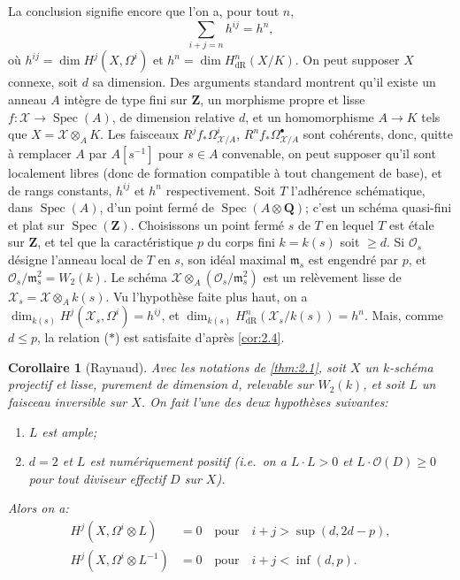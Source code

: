 \documentclass[12pt,a4paper]{article}
\theoremstyle{plain}
\newtheorem{corollary}[theorem]{Corollaire}
\theoremstyle{definition}
\theoremstyle{remark}
\DeclareMathOperator{\Spec}{Spec}
\newcommand{\cO}{\mathcal{O}}
\newcommand{\dR}{\text{dR}}
\begin{document}
La conclusion signifie encore que l'on a, pour tout $n$,
\begin{equation}\label{eq:star2}
\sum_{i+j=n} h^{ij} = h^n,
\tag{$*$}
\end{equation}
o\`u $h^{ij} = \dim H^j(X, \Omega^i)$ et $h^n = \dim H^n_{\dR}(X/K)$. On peut supposer $X$ connexe, soit $d$ sa dimension. Des arguments standard montrent qu'il existe un anneau $A$ int\`egre de type fini sur $\mathbf{Z}$, un morphisme propre et lisse $f: \mathscr{X} \to \Spec(A)$, de dimension relative $d$, et un homomorphisme $A \to K$ tels que $X = \mathscr{X} \otimes_A K$. Les faisceaux $R^j f_* \Omega^i_{\mathscr{X}/A}$, $R^n f_* \Omega^{\bullet}_{\mathscr{X}/A}$ sont coh\'erents, donc, quitte \`a remplacer $A$ par $A[s^{-1}]$ pour $s \in A$ convenable, on peut supposer qu'il sont localement libres (donc de formation compatible \`a tout changement de base), et de rangs constants, $h^{ij}$ et $h^n$ respectivement. Soit $T$ l'adh\'erence sch\'ematique, dans $\Spec(A)$, d'un point ferm\'e de $\Spec(A \otimes \mathbf{Q})$; c'est un sch\'ema quasi-fini et plat sur $\Spec(\mathbf{Z})$. Choisissons un point ferm\'e $s$ de $T$ en lequel $T$ est \'etale sur $\mathbf{Z}$, et tel que la caract\'eristique $p$ du corps fini $k = k(s)$ soit $\ge d$. Si $\cO_s$ d\'esigne l'anneau local de $T$ en $s$, son id\'eal maximal $\mathfrak{m}_s$ est engendr\'e par $p$, et $\cO_s/\mathfrak{m}_s^2 = W_2(k)$. Le sch\'ema $\mathscr{X} \otimes_A (\cO_s/\mathfrak{m}_s^2)$ est un rel\`evement lisse de $\mathscr{X}_s = \mathscr{X} \otimes_A k(s)$. Vu l'hypoth\`ese faite plus haut, on a $\dim_{k(s)} H^j(\mathscr{X}_s, \Omega^i) = h^{ij}$, et $\dim_{k(s)} H^n_{\dR}(\mathscr{X}_s/k(s)) = h^n$. Mais, comme $d \le p$, la relation ($*$) est satisfaite d'apr\`es \ref{cor:2.4}.

\begin{corollary}[Raynaud]\label{cor:2.8}
Avec les notations de \ref{thm:2.1}, soit $X$ un $k$-sch\'ema projectif et lisse, purement de dimension $d$, relevable sur $W_2(k)$, et soit $L$ un faisceau inversible sur $X$. On fait l'une des deux hypoth\`eses suivantes:
\begin{enumerate}[label=(\roman*)]
\item $L$ est ample;
\item $d = 2$ et $L$ est num\'eriquement positif (i.e.~on a $L \cdot L > 0$ et $L \cdot \cO(D) \ge 0$ pour tout diviseur effectif $D$ sur $X$).
\end{enumerate}
Alors on a:
\begin{align}
H^j(X, \Omega^i \otimes L) &= 0 \quad \text{pour} \quad i + j > \sup(d, 2d - p), \label{eq:2.8.1} \\
H^j(X, \Omega^i \otimes L^{-1}) &= 0 \quad \text{pour} \quad i + j < \inf(d, p). \label{eq:2.8.2}
\end{align}
\end{corollary}
\end{document}
